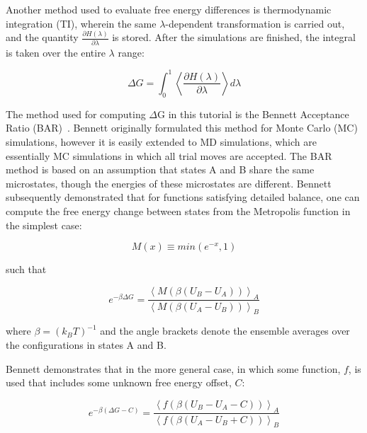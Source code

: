 \documentclass[9pt,tutorial]{livecoms}
\begin{document}
Another method used to evaluate free energy differences is thermodynamic integration (TI), wherein the same $\lambda$-dependent transformation is carried out, and the quantity $\frac{\partial H(\lambda)}{\partial \lambda}$ is stored. After the simulations are finished, the integral is taken over the entire $\lambda$ range:

\begin{equation} \label{ti_eq}
\Delta G = \int_{0}^{1} \left\langle \frac{\partial H(\lambda)}{\partial \lambda} \right\rangle d\lambda
\end{equation}

The method used for computing $\Delta$G in this tutorial is the Bennett Acceptance Ratio (BAR)~\cite{Bennett1976}. Bennett originally formulated this method for Monte Carlo (MC) simulations, however it is easily extended to MD simulations, which are essentially MC simulations in which all trial moves are accepted. The BAR method is based on an assumption that states A and B share the same microstates, though the energies of these microstates are different. Bennett subsequently demonstrated that for functions satisfying detailed balance, one can compute the free energy change between states from the Metropolis function in the simplest case:

\begin{equation} \label{metropolis_eq}
M(x) \equiv min(e^{-x}, 1)
\end{equation}

such that

\begin{equation} \label{bar_simplest_eq}
e^{-\beta\Delta G} = \frac{\left\langle M\left(\beta\left(U_B - U_A\right)\right)\right\rangle_A}{\left\langle M\left(\beta\left(U_A - U_B\right)\right)\right\rangle_B}
\end{equation}

where $\beta = (k_B T)^{-1}$ and the angle brackets denote the ensemble averages over the configurations in states A and B.

Bennett demonstrates that in the more general case, in which some function, $f$, is used that includes some unknown free energy offset, $C$:

\begin{equation} \label{bar_general_eq}
e^{-\beta(\Delta G - C)} = \frac{\left\langle f\left(\beta\left(U_B - U_A - C\right)\right)\right\rangle_A}{\left\langle f\left(\beta\left(U_A - U_B + C\right)\right)\right\rangle_B}
\end{equation}
\end{document}
